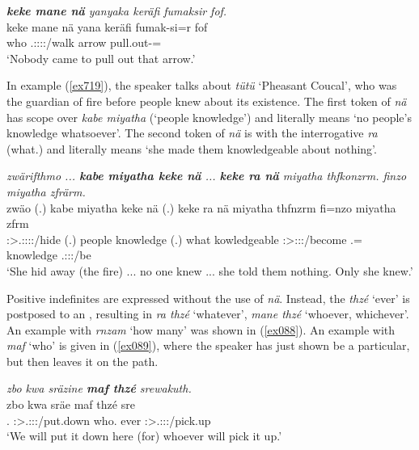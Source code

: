 \begin{exe}
	\ex \emph{\textbf{keke mane nä} yanyaka keräfi fumaksir fof.}\\
	\gll keke mane nä yana keräfi fumak-si=r fof\\
	{\Neg} who {\Indf} \Tsg.\Masc:\Sbj:\Pst:\Ipfv:\Venit/walk arrow pull.out-\Nmlz={\Purp} \Emph\\
	\trans `Nobody came to pull out that arrow.' 
	\label{ex697}
\end{exe}

In example (\ref{ex719}), the speaker talks about \emph{tütü} `Pheasant Coucal', who was the guardian of fire before people knew about its existence. The first token of \emph{nä} has scope over \emph{kabe miyatha} (`people knowledge') and literally means `no people's knowledge whatsoever'. The second token of \emph{nä} is with the interrogative \emph{ra} (what.{\Abs}) and literally means `she made them knowledgeable about nothing'.

\begin{exe}
	\ex \emph{zwärifthmo ... \textbf{kabe miyatha keke nä} ... \textbf{keke ra nä} miyatha thfkonzrm. finzo miyatha zfrärm.}\\
	\gll zwäo (.) kabe miyatha keke nä (.) keke ra nä miyatha thfnzrm fi=nzo miyatha zfrm\\
	\Sg:\Sbj>\Tsg.\F:\Obj:\Rpst:\Pfv:\Andat/hide (.) people knowledge {\Neg} {\Indf} (.) {\Neg} what {\Indf} kowledgeable \Stsg:\Sbj>\Stpl:\Obj:\Pst:\Dur/become \Third.\Abs={\Only} knowledge \Tsg.\F:\Sbj:\Pst:\Dur/be\\
	\trans `She hid away (the fire) ... no one knew ... she told them nothing. Only she knew.' 
	\label{ex719}
\end{exe}

Positive indefinites are expressed without the use of \emph{nä}. Instead, the  \emph{thzé} `ever' is postposed to an , resulting in \emph{ra thzé} `whatever', \emph{mane thzé} `whoever, whichever'. An example with \emph{rnzam} `how many' was shown in (\ref{ex088}). An example with \emph{maf} `who' is given in (\ref{ex089}), where the speaker has just shown be a particular, but then leaves it on the path.

\begin{exe}
	\ex \emph{zbo kwa sräzine \textbf{maf thzé} srewakuth.}\\
	\gll zbo kwa sräe maf thzé sre\\
	{\Prox}.{\All} {\Fut} \Fpl{}:\Sbj>\Tsg.\Masc:\Obj:\Irr:\Pfv/put.down who.{\Erg} ever \Stsg:\Sbj>\Tsg.\Masc:\Obj:\Irr:\Pfv/pick.up\\
	\trans `We will put it down here (for) whoever will pick it up.'
	\label{ex089}
\end{exe}%

